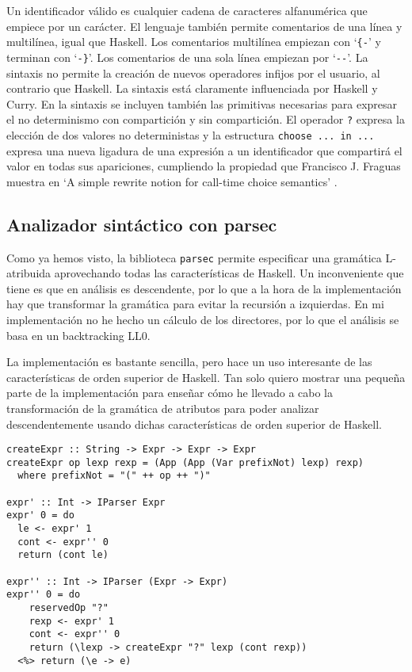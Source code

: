 \documentclass[class=article, crop=false]{standalone}
\begin{document}
Un identificador válido es cualquier cadena de caracteres alfanumérica que empiece por un
carácter. El lenguaje también permite comentarios de una línea y multilínea, igual que
Haskell. Los comentarios multilínea empiezan con `\verb`{-`' y terminan con `\verb`-}`'. Los
comentarios de una sola línea empiezan por `\verb`--`'. La sintaxis no permite la creación de
nuevos operadores infijos por el usuario, al contrario que Haskell\cite{marlow2010haskell}.
La sintaxis está claramente influenciada por Haskell y Curry. En la sintaxis se incluyen
también las primitivas necesarias para expresar el no determinismo con compartición y sin
compartición. El operador \verb`?` expresa la elección de dos valores no deterministas y la
estructura \verb`choose ... in ...` expresa una nueva ligadura de una expresión a un
identificador que compartirá el valor en todas sus apariciones, cumpliendo la propiedad que
Francisco J. Fraguas muestra en `A simple rewrite notion for call-time choice semantics'
\cite{lopez2007simple}.

\subsection{Analizador sintáctico con parsec}\label{sec:analizador_sintactico}

Como ya hemos visto, la biblioteca \verb`parsec` permite especificar una gramática
L-atribuida aprovechando todas las características de Haskell. Un inconveniente que tiene es
que en análisis es descendente, por lo que a la hora de la implementación hay que transformar
la gramática para evitar la recursión a izquierdas. En mi implementación no he hecho un
cálculo de los directores, por lo que el análisis se basa en un backtracking LL0.

La implementación es bastante sencilla, pero hace un uso interesante de las características
de orden superior de Haskell. Tan solo quiero mostrar una pequeña parte de la
implementación para enseñar cómo he llevado a cabo la transformación de la gramática de
atributos para poder analizar descendentemente usando dichas características de orden
superior de Haskell.

\begin{verbatim}
createExpr :: String -> Expr -> Expr -> Expr
createExpr op lexp rexp = (App (App (Var prefixNot) lexp) rexp)
  where prefixNot = "(" ++ op ++ ")"

expr' :: Int -> IParser Expr
expr' 0 = do
  le <- expr' 1
  cont <- expr'' 0
  return (cont le)

expr'' :: Int -> IParser (Expr -> Expr)
expr'' 0 = do
    reservedOp "?"
    rexp <- expr' 1
    cont <- expr'' 0
    return (\lexp -> createExpr "?" lexp (cont rexp))
  <%> return (\e -> e)
\end{verbatim}
\end{document}
